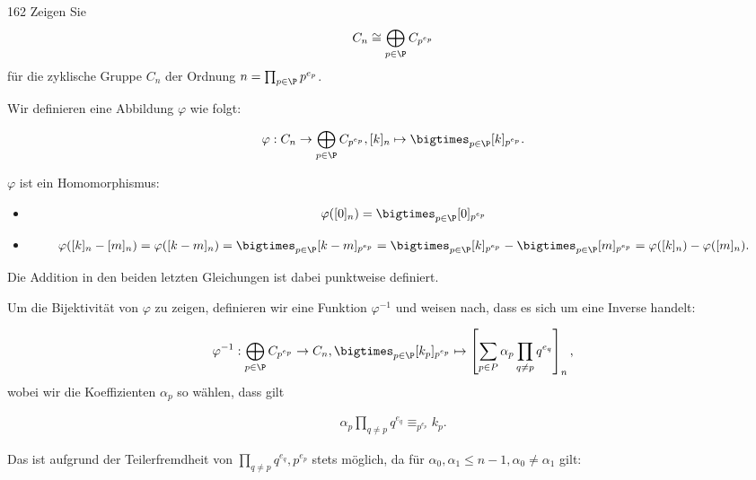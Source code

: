 \begin{algebraUE}{162}
Zeigen Sie
\begin{align*}
  C_n \cong \bigoplus_{p \in \P} C_{p^{e_p}}
\end{align*}
für die zyklische Gruppe $C_n$ der Ordnung $n = \prod_{p \in \P}p^{e_p}$.
\end{algebraUE}
\begin{solution}
Wir definieren eine Abbildung $\varphi$ wie folgt:

\begin{align*}
    \varphi: C_n \rightarrow \bigoplus_{p \in \P} C_{p^{e_p}}, [k]_n \mapsto \bigtimes_{p \in \P} [k]_{p^{e_p}}.
\end{align*}

$\varphi$ ist ein Homomorphismus:
\begin{itemize}
\item
\begin{align*}
    \varphi([0]_{n}) = \bigtimes_{p \in \P}[0]_{p^{e_p}}
    \end{align*}
\item
\begin{align*}
      \varphi([k]_n - [m]_n) = \varphi([k-m]_n) = \bigtimes_{p \in \P} [k-m]_{p^{e_p}} =
      \bigtimes_{p \in \P} [k]_{p^{e_p}} -
      \bigtimes_{p \in \P} [m]_{p^{e_p}} =
      \varphi([k]_n) - \varphi([m]_n).
\end{align*}
\end{itemize}
Die Addition in den beiden letzten Gleichungen ist dabei punktweise definiert.

Um die Bijektivität von $\varphi$ zu zeigen, definieren wir eine Funktion $\varphi^{-1}$ und weisen nach, dass es sich um eine Inverse handelt:

\begin{align*}
   \varphi^{-1}: \bigoplus_{p \in \P} C_{p^{e_p}} \rightarrow C_n, \bigtimes_{p \in \P} [k_p]_{p^{e_p}}
   \mapsto \left[\sum_{p \in P} \alpha_p \prod_{q \neq p} q^{e_q}\right]_n,
\end{align*}
wobei wir die Koeffizienten $\alpha_p$ so wählen, dass gilt

\begin{align*}
    \alpha_p \prod_{q \neq p} q^{e_q} \equiv_{p^{e_{p}}} k_{p}.
\end{align*}

Das ist aufgrund der Teilerfremdheit von $\prod_{q \neq p} q^{e_q}, p^{e_p}$ stets möglich,
da für $\alpha_0, \alpha_1 \leq n-1, \alpha_0 \neq \alpha_1$ gilt:


\end{solution}
